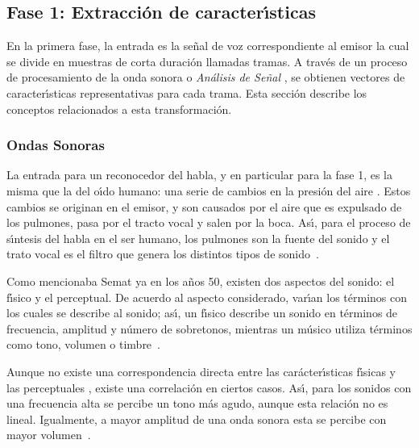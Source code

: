 \subsection{Fase 1: Extracci\'on de caracter{\'\i}sticas}
\label{sec:featureExtraction}

En la primera fase, la entrada es la se\~nal de voz correspondiente al emisor la cual se divide en muestras de corta
duraci\'on llamadas tramas. A trav\'es de un proceso de procesamiento de la onda sonora o \emph{An\'alisis de Se\~nal} \cite{Jurafsky}, se obtienen vectores de 
caracter{\'\i}sticas representativas para cada trama. Esta secci\'on describe los conceptos relacionados a esta 
transformaci\'on.

\subsubsection{Ondas Sonoras}

La entrada para un reconocedor del habla, y en particular para la fase 1, es la misma que la del o{\'\i}do humano: una 
serie de cambios en la presi\'on del aire \cite{YoungUniversity2007}. Estos cambios se originan en el emisor, y son 
causados por el aire que es expulsado de los pulmones, pasa por el tracto vocal y salen por la boca. As{\'\i}, para el 
proceso de s{\'\i}ntesis del habla en el ser humano, los pulmones son la fuente
del sonido y el trato vocal es el filtro que genera los distintos tipos de \mbox{sonido \cite{BradburyLineal2000}}.

Como mencionaba Semat ya en los a\~nos 50, existen dos aspectos del sonido: el f{\'\i}sico y el perceptual. De acuerdo al 
aspecto considerado, var{\'\i}an los t\'erminos con los cuales se describe al sonido; as{\'\i}, un f{\'\i}sico describe un 
sonido en t\'erminos de frecuencia, amplitud y n\'umero de sobretonos, mientras un m\'usico utiliza t\'erminos como tono, 
volumen o \mbox{timbre \cite{SematPhysics1958}}.

Aunque no existe una correspondencia directa entre las car\'acter{\'\i}sticas f{\'\i}sicas y las perceptuales 
\cite{SematPhysics1958}, existe una correlaci\'on en ciertos casos. As{\'\i}, para los sonidos con una frecuencia alta se 
percibe un tono m\'as agudo, aunque esta relaci\'on no es lineal. Igualmente, a mayor amplitud de una onda sonora esta se 
percibe con mayor \mbox{volumen \cite{YoungUniversity2007}}.

